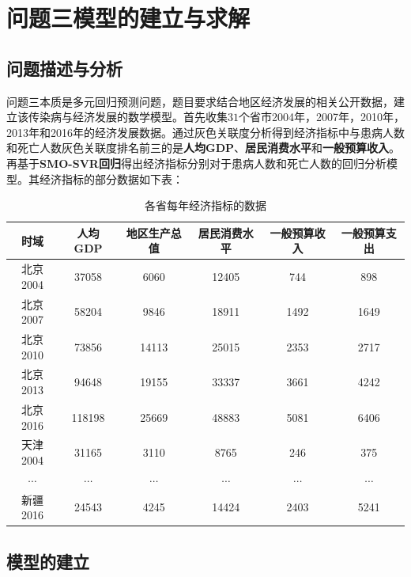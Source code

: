 \documentclass{whutmod}
\begin{document}
     	\section{问题三模型的建立与求解}
     \subsection{问题描述与分析}
            问题三本质是多元回归预测问题，题目要求结合地区经济发展的相关公开数据，建立该传染病与经济发展的数学模型。首先收集$31$个省市2004年，2007年，2010年，2013年和2016年的经济发展数据。通过灰色关联度分析得到经济指标中与患病人数和死亡人数灰色关联度排名前三的是\textbf{人均GDP}、\textbf{居民消费水平}和\textbf{一般预算收入}。再基于\textbf{SMO-SVR回归}得出经济指标分别对于患病人数和死亡人数的回归分析模型。其经济指标的部分数据如下表：
             \begin{table}[H]
    	\centering\caption{各省每年经济指标的数据}\label{s2ss}
    	\begin{tabular}{cccccc}
    		\toprule[1.5pt]
    		\multicolumn{1}{m{1.8cm}}{\centering 时域
    		}
    		& \multicolumn{1}{m{1.8cm}}{\centering 人均GDP}
    		& \multicolumn{1}{m{1.8cm}}{\centering 地区生产总值}
    		& \multicolumn{1}{m{1.8cm}}{\centering 居民消费水平
    		}
    		& \multicolumn{1}{m{1.8cm}}{\centering 一般预算收入
    		}
      		& \multicolumn{1}{m{1.8cm}}{\centering 一般预算支出
      		}
    		  
    		\\
    		\midrule[0.5pt]	
    		北京2004 & 37058 &6060&12405&744&898
    		\\ 
    		北京2007 & 58204&9846&18911&1492&1649\\
    		北京2010 &73856 &14113&25015&2353&2717\\
    		北京2013 & 94648&19155&33337&3661&4242\\
    		北京2016 & 118198&25669&48883&5081&6406\\
    		天津2004 &31165 &3110&8765&246&375\\
    		$\cdots$ &$\cdots$ &$\cdots$&$\cdots$&$\cdots$&$\cdots$\\
    		新疆2016 &24543 &4245&14424&2403&5241\\
    		\bottomrule[1.5pt]	
    	\end{tabular}
    \end{table}
     
     
     \subsection{模型的建立}
\end{document}
